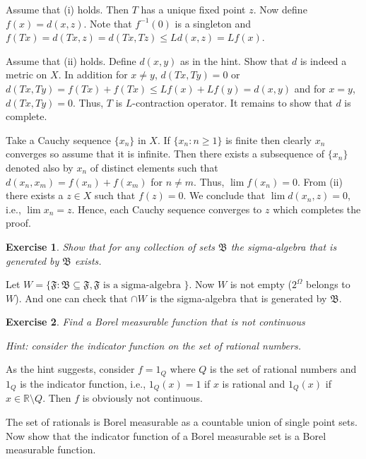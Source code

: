 \documentclass[letter,11pt]{article}
\newtheorem{exercise}{Exercise}[section]
\begin{document}
Assume that (i) holds. Then $T$ has a unique fixed point $z$. Now define $f(x) = d(x,z)$. Note that  $f^{-1}(0)$ is a singleton and $f(Tx) = d(Tx,z)  = d(Tx, Tz) \leq Ld(x,z) = Lf(x) $. 

Assume that (ii) holds. Define $d(x,y)$ as in the hint. Show that $d$ is indeed a metric on $X$. In addition for $x \neq y$, $d(Tx,Ty) = 0 $ or $d(Tx,Ty) = f(Tx) + f(Tx) \leq Lf(x) + Lf(y) = d(x,y)$ and for $x=y$, $d(Tx, Ty) = 0$. Thus, $T$ is $L$-contraction operator. It remains to show that $d$ is complete. 

Take a Cauchy sequence $\{x_{n} \}$ in $X$. If $\{x_{n}: n \geq 1 \}$ is finite then clearly $x_{n}$ converges so assume that it is infinite. Then there exists a subsequence of $\{x_{n} \}$ denoted also by $x_{n}$ of distinct elements such that $d(x_{n},x_{m}) = f(x_{n}) + f(x_{m})$ for $n \neq m$. Thus, $ \lim f(x_{n}) =0$. From (ii) there exists a $z \in X$ such that $f(z) = 0$. We conclude that $\lim d(x_{n},z) = 0$, i.e., $\lim x_{n} =z$. Hence, each Cauchy sequence converges to $z$ which completes the proof. 





 \begin{exercise} Show that for any collection of sets $\mathfrak{B}$ the sigma-algebra that is generated by  $\mathfrak{B}$ exists. 
 \end{exercise}


Let $W = \{ \mathfrak{F}: \mathfrak{B} \subseteq \mathfrak{F},  \mathfrak{F}  \text{ is a sigma-algebra } \} $. 
Now $W$ is not empty ($2^{\Omega}$ belongs to $W$). And one can check that $\cap W$ is the sigma-algebra that is generated by  $\mathfrak{B}$. 


   \begin{exercise} 
 Find a Borel measurable function that is not continuous 
 
 Hint: consider the indicator function on the set of rational numbers. 
 \end{exercise}

 As the hint suggests, consider $f = 1_{Q}$ where $Q$ is the set of rational numbers and $1_{Q}$ is the indicator function, i.e., $1_{Q}(x) = 1$ if $x$ is rational and $1_{Q}(x)$ if $x \in \mathbb{R} \setminus Q$. Then $f$ is obviously not continuous. 
 
 The set of rationals is Borel measurable as a countable union of single point sets. Now show that the indicator function of a Borel measurable set is a Borel measurable function. 
\end{document}
